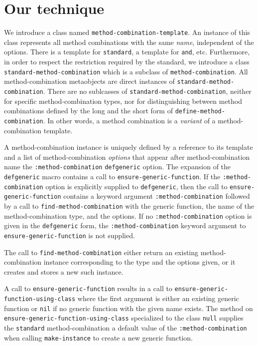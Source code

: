 \section{Our technique}

We introduce a class named \texttt{method-combination-template}.  An
instance of this class represents all method combinations with the
same \emph{name}, independent of the options.  There is a template for
\texttt{standard}, a template for \texttt{and}, etc.  Furthermore, in
order to respect the restriction required by the standard, we
introduce a class \texttt{standard-method-combination} which is a
subclass of \texttt{method-combination}.  All method-combination
metaobjects are direct instances of
\texttt{standard-method-combination}.  There are no sublcasses of
\texttt{standard-method-combination}, neither for specific
method-combination types, nor for distinguishing between method
combinations defined by the long and the short form of
\texttt{define-method-combination}.  In other words, a method
combination is a \emph{variant} of a method-combination template.

A method-combination instance is uniquely defined by a reference to
its template and a list of method-combination \emph{options} that
appear after method-combination name the \texttt{:method-combination}
\texttt{defgeneric} option.  The expansion of the \texttt{defgeneric}
macro contains a call to \texttt{ensure-generic-function}.
If the \texttt{:method-combination} option is explicitly supplied to
\texttt{defgeneric}, then the call to \texttt{ensure-generic-function}
contains a keyword argument \texttt{:method-combination} followed by a
call to \texttt{find-method-combination} with the generic function,
the name of the method-combination type, and the options.  If no
\texttt{:method-combination} option is given in the
\texttt{defgeneric} form, the \texttt{:method-combination} keyword
argument to \texttt{ensure-generic-function} is not supplied.

The call to \texttt{find-method-combination} either return an existing
method-combination instance corresponding to the type and the options
given, or it creates and stores a new such instance.

A call to \texttt{ensure-generic-function} results in a call to
\texttt{ensure-generic-function-using-class} where the first argument
is either an existing generic function or \texttt{nil} if no generic
function with the given name exists.  The method on
\texttt{ensure-generic-function-using-class} specialized to the class
\texttt{null} supplies the \texttt{standard} method-combination a
default value of the \texttt{:method-combination} when calling
\texttt{make-instance} to create a new generic function.

